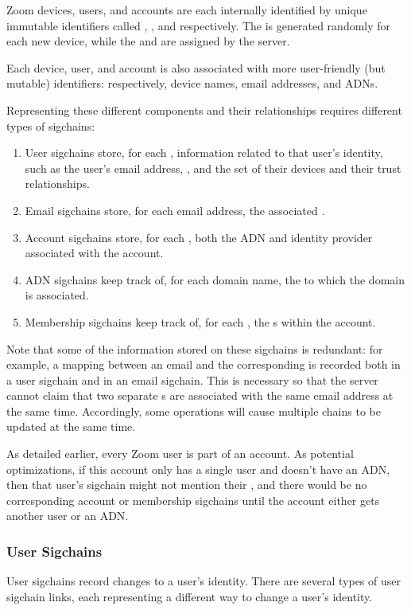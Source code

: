 Zoom devices, users, and accounts are each internally identified by unique immutable identifiers
called \deviceid, \userID, and \accountID respectively. The \deviceid is generated randomly for each
new device, while the \userID and \accountID are assigned by the server.

Each device, user, and account is also associated with more user-friendly (but mutable) identifiers:
respectively, device names, email addresses, and ADNs.

Representing these different components and their relationships requires different types of
sigchains:

\begin{enumerate}
\item User sigchains store, for each \userID, information related to that user's identity, such as
    the user's email address, \accountID, and the set of their devices and their trust
    relationships.
\item Email sigchains store, for each email address, the associated \userID.
\item Account sigchains store, for each \accountID, both the ADN and identity provider associated with
    the account.
\item ADN sigchains keep track of, for each domain name, the \accountID to which the domain is
    associated.
\item Membership sigchains keep track of, for each \accountID, the {\userID}s within the account.
\end{enumerate}

Note that some of the information stored on these sigchains is redundant: for example, a mapping
between an email and the corresponding \userID is recorded both in a user sigchain and in an email
sigchain. This is necessary so that the server cannot claim that two separate {\userID}s are
associated with the same email address at the same time. Accordingly, some operations will cause
multiple chains to be updated at the same time.

As detailed earlier, every Zoom user is part of an account. As potential optimizations, if this
account only has a single user and doesn't have an ADN, then that user's sigchain might not mention
their \accountID, and there would be no corresponding account or membership sigchains until the
account either gets another user or an ADN.

\subsubsection{User Sigchains}
 \label{subsubsec:usersigchains}
User sigchains record changes to a user's identity. There are several types of user sigchain links,
each representing a different way to change a user's identity.


